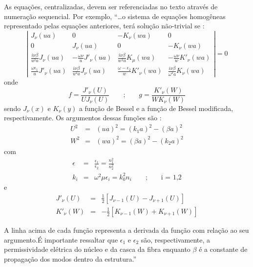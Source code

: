 \documentclass[a4paper,11pt]{article}
\begin{document}
As equa{\c c}{\~o}es, centralizadas, devem ser referenciadas no texto atrav{\'e}s de numera{\c c}{\~a}o sequencial. Por exemplo, ``\ldots o sistema de equa{\c c}{\~o}es homog{\^e}neas representado pelas equa{\c c}{\~o}es anteriores, ter{\'a} solu{\c c}{\~a}o n{\~a}o-trivial se :\\
\begin{equation} \left |
\begin{array}{cccc}
J_{\nu}(ua) & 0 & -K_{\nu}(wa) & 0 \\
0 & J_{\nu}(ua) & 0 & -K_{\nu}(wa) \\
\frac{i \nu \beta}{u^2 a}J_{\nu}(ua) & -\frac{\omega \nu}{u} J'_{\nu}(ua) & \frac{i \nu \beta}{w^2 a}K_{\mu}(wa) & -\frac{\omega \nu}{w} K'_{\nu}(wa) \\[6pt]
\frac{\omega \epsilon_{1}}{u}J'_{\nu}(ua)& \frac{i \nu \beta}{u^2 a}J_{\nu}(ua) & \frac{\omega-\epsilon_{2}}{w}K'_{\nu}(wa) & \frac{i \nu \beta}{\omega^2 a}K_{\nu}(wa)
\end{array}
\right | = 0
\end{equation}
onde
\begin{equation}
f=\frac{J'_{\nu}(U)}{UJ_{\nu}(U)} \qquad\mbox{;}\qquad g=\frac{K'_{\nu}(W)}{WK_{\nu}(W)}
\end{equation}
sendo  $J_{\nu}(x)$ e $K_{\nu}(y)$ a fun{\c c}{\~a}o de Bessel e a fun{\c c}{\~a}o de Bessel modificada, respectivamente. Os argumentos dessas fun{\c c}{\~o}es s{\~a}o :
\begin{eqnarray}
U^2 &=& (ua)^2 = (k_{1}a)^2 - (\beta a)^2\\ 
W^2 &=& (wa)^2 = (\beta a)^2 - (k_{2}a)^2 
\end{eqnarray}
com
\begin{eqnarray}
\epsilon &=& \frac{\epsilon_{1}}{\epsilon_{2}} = \frac{n_{1}^2}{n_{2}^2}\\
 k_{i} &=& \omega^2 \mu \epsilon_{i} = k_{0}^2 n_{i} \qquad \mbox{;}\qquad  \mbox{i = 1,2}
\end{eqnarray}
e
\begin{eqnarray}
J'_{\nu}(U) &=& \frac{1}{2}[J_{\nu-1}(U) - J_{\nu+1}(U)]\\
K'_{\nu}(W) &=& -\frac{1}{2}[K_{\nu-1}(W) + K_{\nu+1}(W)] 
\end{eqnarray}

A linha acima de cada fun{\c c}{\~a}o representa a derivada da fun{\c c}{\~a}o com rela{\c c}{\~a}o ao seu argumento.{\'E} importante ressaltar que $\epsilon_{1}$ e $\epsilon_{2}$ s{\~a}o, respectivamente, a permissividade el{\'e}trica do n{\'u}cleo e da casca da fibra enquanto $\beta$ {\'e} a constante de propaga{\c c}{\~a}o dos modos dentro da estrutura.''
\end{document}
